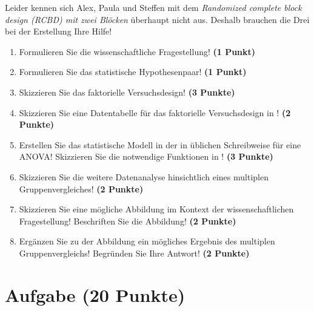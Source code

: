 \documentclass[a4paper, 9pt]{scrartcl}\usepackage[]{graphicx}\usepackage[]{xcolor}
\begin{document}
Leider kennen sich Alex, Paula und Steffen mit dem \textit{Randomized complete block design (RCBD) mit zwei Blöcken} überhaupt nicht aus. Deshalb brauchen die Drei bei der Erstellung Ihre Hilfe!

\begin{enumerate}
  \setcounter{enumi}{0}
  \item Formulieren Sie die wissenschaftliche Fragestellung! \textbf{(1 Punkt)}
  \item Formulieren Sie das statistische Hypothesenpaar! \textbf{(1 Punkt)}
  \item Skizzieren Sie das faktorielle Versuchsdesign! \textbf{(3 Punkte)}
  \item Skizzieren Sie eine Datentabelle für das faktorielle Versuchsdesign in \Rlogo! \textbf{(2 Punkte)}
  \item Erstellen Sie das statistische Modell in der in \Rlogo üblichen Schreibweise für eine ANOVA! Skizzieren Sie die notwendige Funktionen in \Rlogo! \textbf{(3 Punkte)}
  \item Skizzieren Sie die weitere Datenanalyse hinsichtlich eines multiplen Gruppenvergleiches! \textbf{(2 Punkte)}
  \item Skizzieren Sie eine mögliche Abbildung im Kontext der wissenschaftlichen Fragestellung! Beschriften Sie die Abbildung! \textbf{(2 Punkte)}
  \item Ergänzen Sie zu der Abbildung ein mögliches Ergebnis des multiplen Gruppenvergleichs! Begründen Sie Ihre Antwort! \textbf{(2 Punkte)}
\end{enumerate}


 
\clearpage

\section{Aufgabe \hfill (20 Punkte)}
\end{document}
